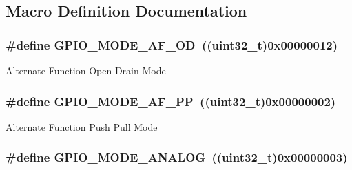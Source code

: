 \subsection{Macro Definition Documentation}
\hypertarget{group___g_p_i_o__mode_ga282b9fd37c8ef31daba314ffae6bf023}{
\subsubsection[{G\-P\-I\-O\-\_\-\-M\-O\-D\-E\-\_\-\-A\-F\-\_\-\-O\-D}]{\setlength{\rightskip}{0pt plus 5cm}\#define G\-P\-I\-O\-\_\-\-M\-O\-D\-E\-\_\-\-A\-F\-\_\-\-O\-D~((uint32\-\_\-t)0x00000012)}}\label{group___g_p_i_o__mode_ga282b9fd37c8ef31daba314ffae6bf023}
Alternate Function Open Drain Mode \hypertarget{group___g_p_i_o__mode_ga526c72c5264316fc05c775b6cad4aa6a}{
\subsubsection[{G\-P\-I\-O\-\_\-\-M\-O\-D\-E\-\_\-\-A\-F\-\_\-\-P\-P}]{\setlength{\rightskip}{0pt plus 5cm}\#define G\-P\-I\-O\-\_\-\-M\-O\-D\-E\-\_\-\-A\-F\-\_\-\-P\-P~((uint32\-\_\-t)0x00000002)}}\label{group___g_p_i_o__mode_ga526c72c5264316fc05c775b6cad4aa6a}
Alternate Function Push Pull Mode \hypertarget{group___g_p_i_o__mode_ga7a04f9ab65ad572ad20791a35009220c}{
\subsubsection[{G\-P\-I\-O\-\_\-\-M\-O\-D\-E\-\_\-\-A\-N\-A\-L\-O\-G}]{\setlength{\rightskip}{0pt plus 5cm}\#define G\-P\-I\-O\-\_\-\-M\-O\-D\-E\-\_\-\-A\-N\-A\-L\-O\-G~((uint32\-\_\-t)0x00000003)}}\label{group___g_p_i_o__mode_ga7a04f9ab65ad572ad20791a35009220c}
